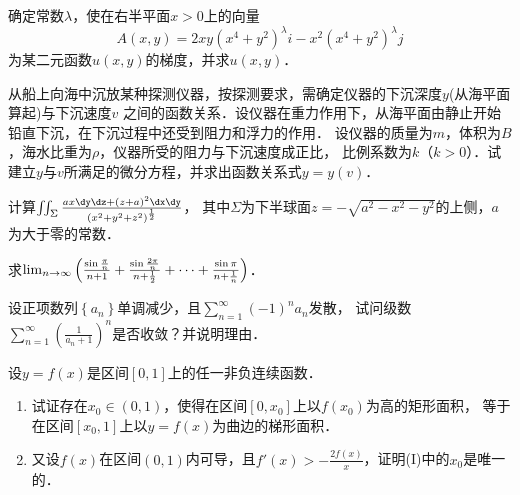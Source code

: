 \documentclass[plain,noanswer,medmath]{../../template/jnuexam}
\begin{document}

\begin{problem}
确定常数$\lambda$，使在右半平面$x > 0$上的向量
$$A(x,y) = 2xy (x^4 + y^2)^{\lambda} i - x^2(x^4 + y^2)^{\lambda} j$$
为某二元函数$u(x,y)$的梯度，并求$u(x,y)$．
\end{problem}



\begin{problem}
从船上向海中沉放某种探测仪器，按探测要求，需确定仪器的下沉深度$y$(从海平面算起)与下沉速度$v$
之间的函数关系．设仪器在重力作用下，从海平面由静止开始铅直下沉，在下沉过程中还受到阻力和浮力的作用．
设仪器的质量为$m$，体积为$B$，海水比重为$\rho$，仪器所受的阻力与下沉速度成正比，
比例系数为$k$（$k > 0$）．试建立$y$与$v$所满足的微分方程，并求出函数关系式$y = y(v)$．
\end{problem}



\begin{problem}
计算$\iint_{\Sigma}\frac{ax\dy\dz + (z + a)^2 \dx\dy}{(x^2 + y^2 + z^2)^{\frac{1}{2}}}$，
其中$\Sigma$为下半球面$z = - \sqrt{a^2 - x^2 - y^2}$的上侧，$a$为大于零的常数．
\end{problem}



\begin{problem}
求$\lim_{n \to \infty} \left(\frac{\sin \frac{\pi}{n}}{n + 1\vphantom{\frac{1}{1}}}
+ \frac{\sin \frac{2\pi}{n}}{n + \frac{1}{2}} + \cdots
+ \frac{\sin \pi\vphantom{\frac{1}{n}}}{n + \frac{1}{n}} \right)$．
\end{problem}



\begin{problem}
设正项数列$\left\{a_n \right\}$单调减少，且$\sum_{n = 1}^{\infty}(- 1)^n a_n$发散，
试问级数$\sum_{n = 1}^{\infty}\left(\frac{1}{a_n + 1} \right)^n$是否收敛？并说明理由．
\end{problem}



\begin{problem}
设$y = f(x)$是区间$[0,1]$上的任一非负连续函数．
\begin{enumerate}
\item 试证存在$x_0 \in(0,1)$，使得在区间$\left[0,x_0 \right]$上以$f(x_0)$为高的矩形面积，
      等于在区间$\left[x_0,1 \right]$上以$y = f(x)$为曲边的梯形面积．
\item 又设$f(x)$在区间$(0,1)$内可导，且$f'(x) > - \frac{2f(x)}{x}$，证明(I)中的$x_0$是唯一的．
\end{enumerate}
\end{problem}
\end{document}
